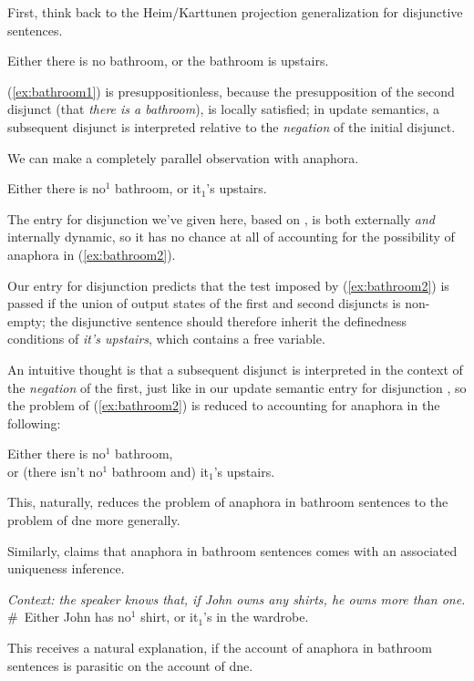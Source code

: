 \documentclass[nols,twoside,nofonts,nobib,nohyper]{tufte-handout}
\theoremstyle{definition}
\begin{document}
First, think back to the Heim/Karttunen projection generalization for disjunctive sentences.

\ex
Either there is no bathroom, or the bathroom is upstairs.\label{ex:bathroom1}
\xe

(\ref{ex:bathroom1}) is presuppositionless, because the presupposition of the second disjunct (that \textit{there is a bathroom}), is locally satisfied; in update semantics, a subsequent disjunct is interpreted relative to the \textit{negation} of the initial disjunct.

We can make a completely parallel observation with anaphora.

\ex
Either there is no$^{1}$ bathroom, or it$_{1}$'s upstairs.\label{ex:bathroom2}
\xe

The entry for disjunction we've given here, based on \citet{GroenendijkStokhof1991}, is both externally \textit{and} internally dynamic, so it has no chance at all of accounting for the possibility of anaphora in (\ref{ex:bathroom2}).


Our entry for disjunction predicts that the test imposed by (\ref{ex:bathroom2}) is passed if the union of output states of the first and second disjuncts is non-empty; the disjunctive sentence should therefore inherit the definedness conditions of \textit{it's upstairs}, which contains a free variable.

An intuitive thought is that a subsequent disjunct is interpreted in the context of the \textit{negation} of the first, just like in our update semantic entry for disjunction \citep{Beaver2001}, so the problem of (\ref{ex:bathroom2}) is reduced to accounting for anaphora in the following:

\ex
Either there is no$^{1}$ bathroom,\\
or (there isn't no$^{1}$ bathroom and) it$_{1}$'s upstairs.
\xe

This, naturally, reduces the problem of anaphora in bathroom sentences to the problem of \ac{dne} more generally.

Similarly, \citet{Gotham2019} claims that anaphora in bathroom sentences comes with an associated uniqueness inference.

\ex\textit{Context: the speaker knows that, if John owns any shirts, he owns more than one.}\\
\# Either John has no$^{1}$ shirt, or it$_{1}$'s in the wardrobe.
\xe

This receives a natural explanation, if the account of anaphora in bathroom sentences is parasitic on the account of \ac{dne}.
\end{document}
